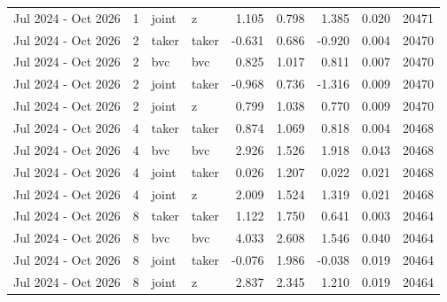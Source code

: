 \begin{tabular}{lrllrrrrr}
Jul 2024 - Oct 2026 & 1 & joint & z & 1.105 & 0.798 & 1.385 & 0.020 & 20471 \\
Jul 2024 - Oct 2026 & 2 & taker & taker & -0.631 & 0.686 & -0.920 & 0.004 & 20470 \\
Jul 2024 - Oct 2026 & 2 & bvc & bvc & 0.825 & 1.017 & 0.811 & 0.007 & 20470 \\
Jul 2024 - Oct 2026 & 2 & joint & taker & -0.968 & 0.736 & -1.316 & 0.009 & 20470 \\
Jul 2024 - Oct 2026 & 2 & joint & z & 0.799 & 1.038 & 0.770 & 0.009 & 20470 \\
Jul 2024 - Oct 2026 & 4 & taker & taker & 0.874 & 1.069 & 0.818 & 0.004 & 20468 \\
Jul 2024 - Oct 2026 & 4 & bvc & bvc & 2.926 & 1.526 & 1.918 & 0.043 & 20468 \\
Jul 2024 - Oct 2026 & 4 & joint & taker & 0.026 & 1.207 & 0.022 & 0.021 & 20468 \\
Jul 2024 - Oct 2026 & 4 & joint & z & 2.009 & 1.524 & 1.319 & 0.021 & 20468 \\
Jul 2024 - Oct 2026 & 8 & taker & taker & 1.122 & 1.750 & 0.641 & 0.003 & 20464 \\
Jul 2024 - Oct 2026 & 8 & bvc & bvc & 4.033 & 2.608 & 1.546 & 0.040 & 20464 \\
Jul 2024 - Oct 2026 & 8 & joint & taker & -0.076 & 1.986 & -0.038 & 0.019 & 20464 \\
Jul 2024 - Oct 2026 & 8 & joint & z & 2.837 & 2.345 & 1.210 & 0.019 & 20464 \\
\bottomrule
\end{tabular}
